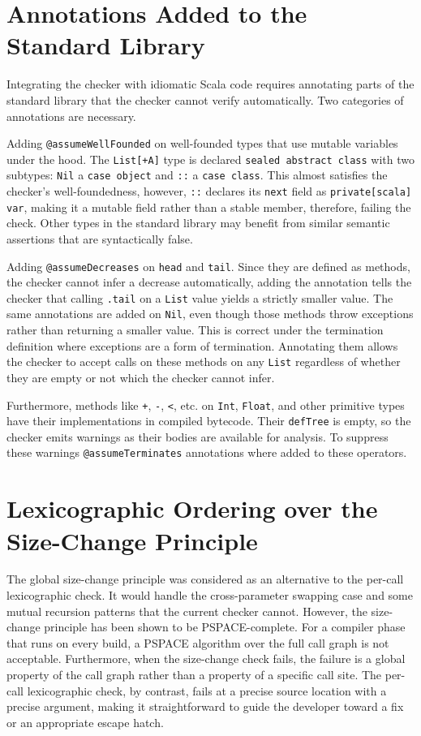 \section{Annotations Added to the Standard Library}
Integrating the checker with idiomatic Scala code requires annotating parts of
the standard library that the checker cannot verify automatically.
Two categories of annotations are necessary.

Adding \texttt{@assumeWellFounded} on well-founded types that use mutable
variables under the hood. The \texttt{List[+A]} type is declared \texttt{sealed
abstract class} with two subtypes: \texttt{Nil} a \texttt{case object} and
\texttt{::} a \texttt{case class}. This almost satisfies the checker's
well-foundedness, however, \texttt{::} declares its \texttt{next} field as
\texttt{private[scala] var}, making it a mutable field rather than a stable
member, therefore, failing the check.
Other types in the standard library may benefit from similar semantic assertions
that are syntactically false.

Adding \texttt{@assumeDecreases} on \texttt{head} and \texttt{tail}. Since they
are defined as methods, the checker cannot infer a decrease automatically,
adding the annotation tells the checker that calling \texttt{.tail} on a
\texttt{List} value yields a strictly smaller value.
The same annotations are added on \texttt{Nil}, even though those methods throw
exceptions rather than returning a smaller value. This is correct under the
termination definition where exceptions are a form of termination. Annotating
them allows the checker to accept calls on these methods on any \texttt{List}
regardless of whether they are empty or not which the checker cannot infer.

Furthermore, methods like \texttt{+}, \texttt{-}, \texttt{<}, etc. on
\texttt{Int}, \texttt{Float}, and other primitive types have their
implementations in compiled bytecode. Their \texttt{defTree} is empty, so the
checker emits warnings as their bodies are available for analysis. To suppress
these warnings \texttt{@assumeTerminates} annotations where added to these
operators.


\section{Lexicographic Ordering over the Size-Change Principle}
The global size-change principle \cite{SizeChange} was considered as an
alternative to the per-call lexicographic check. It would handle the
cross-parameter swapping case and some mutual recursion patterns that the
current checker cannot.
However, the size-change principle has been shown to be
\textsf{PSPACE-complete}. For a compiler phase that runs on every build, a
\textsf{PSPACE} algorithm over the full call graph is not acceptable.
Furthermore, when the size-change check fails, the failure is a global property
of the call graph rather than a property of a specific call site. The per-call
lexicographic check, by contrast, fails at a precise source location with a
precise argument, making it straightforward to guide the developer toward a fix
or an appropriate escape hatch.


